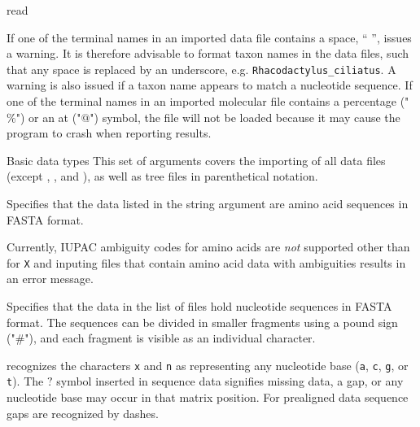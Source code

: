 \begin{command}{read}{}
\begin{arguments}
        \begin{statement}
             If one of the terminal names in an imported data file contains
             a space, `` '', \poy issues a warning. It is therefore advisable to format taxon 
             names in the data files, such that any space is replaced by an underscore, e.g. 
             \texttt{Rhacodactylus\_ciliatus}. A warning is also issued if a taxon name appears to match a 
             nucleotide sequence.  If one of the terminal names in an imported molecular 
             file contains a percentage ("$\%$") or an at ("$@$") symbol, the file will not be loaded 
             because it may cause the program to crash when reporting results.
        \end{statement}

        \begin{argumentgroup}{Basic data types}
            This set of arguments covers the importing of all data files
            (except , ,
             and ), as well
            as tree files in parenthetical notation.
    
                {Specifies that the data listed in the string argument
                are amino acid sequences in FASTA format.} {}
            
            \begin{statement}
                Currently, IUPAC ambiguity codes for amino acids are \emph{not}
                supported other than for \texttt{X} and inputing files that contain amino acid data with
                ambiguities results in an error message.
            \end{statement}
           
                {Specifies that the data in the list of files hold nucleotide
                sequences in FASTA format. The sequences can be divided in smaller
                fragments using a pound sign ("\#"), and each fragment is visible as an
                individual character.} 
                {}
            
             \begin{statement}
                \poy recognizes the characters \texttt{x} and \texttt{n} as
                representing any nucleotide base (\texttt{a}, \texttt{c}, \texttt{g}, 
                or \texttt{t}).  The \texttt{$?$} symbol inserted in sequence data 
                signifies missing data, a gap, or any nucleotide base may occur in 
                that matrix position. For prealigned data sequence gaps are recognized 
                by dashes.
            \end{statement}
            

\end{argumentgroup}
\end{arguments}
\end{command}
